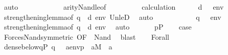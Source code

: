 \begin{isabellebody}
\ auto\isanewline
\ \ \ \ \isamarkupfalse%
\ \isanewline
\ \ \ \ \isamarkupfalse%
\ arity{\isacharunderscore}{\kern0pt}Nand{\isacharunderscore}{\kern0pt}le{\isacharbrackleft}{\kern0pt}of\ {\isasymphi}\ {\isasympsi}{\isacharbrackright}{\kern0pt}\isanewline
\ \ \ \ \isamarkupfalse%
\ \isamarkupfalse%
\ calculation\isanewline
\ \ \ \ \isamarkupfalse%
\ {\isachardoublequoteopen}d\ {\isasymtturnstile}\ {\isasymphi}\ env{\isachardoublequoteclose}\ \isanewline
\ \ \ \ \ \ \ \isamarkupfalse%
\ strengthening{\isacharunderscore}{\kern0pt}lemma{\isacharbrackleft}{\kern0pt}of\ q\ {\isasymphi}\ d\ env{\isacharbrackright}{\kern0pt}\ Un{\isacharunderscore}{\kern0pt}leD{}\ \isamarkupfalse%
\ auto\isanewline
\ \ \ \ \isamarkupfalse%
\isanewline
\ \ \ \ \isamarkupfalse%
\ {\isachardoublequoteopen}{\isasymnot}\ {\isacharparenleft}{\kern0pt}q\ {\isasymtturnstile}\ {\isasympsi}\ env{\isacharparenright}{\kern0pt}{\isachardoublequoteclose}\isanewline
\ \ \ \ \ \ \isamarkupfalse%
\ strengthening{\isacharunderscore}{\kern0pt}lemma{\isacharbrackleft}{\kern0pt}of\ q\ {\isasympsi}\ d\ env{\isacharbrackright}{\kern0pt}\ \isamarkupfalse%
\ auto\isanewline
\ \ \isacommand{{\isacharbraceright}{\kern0pt}}\isamarkupfalse%
\isanewline
\ \ \isamarkupfalse%
\ {\isacartoucheopen}p{\isasymin}P{\isacartoucheclose}\isanewline
\ \ \isamarkupfalse%
\ {\isacharquery}{\kern0pt}case\isanewline
\ \ \ \ \isamarkupfalse%
\ Forces{\isacharunderscore}{\kern0pt}Nand{\isacharbrackleft}{\kern0pt}symmetric{\isacharcomma}{\kern0pt}\ OF\ {\isacharunderscore}{\kern0pt}\ Nand{\isacharparenleft}{\kern0pt}{}{\isacharcomma}{\kern0pt}{}{\isacharcomma}{\kern0pt}{}{\isacharparenright}{\kern0pt}{\isacharbrackright}{\kern0pt}\ \isamarkupfalse%
\ blast\isanewline
{}\isamarkupfalse%
\isanewline
\ \ \isamarkupfalse%
\ {\isacharparenleft}{\kern0pt}Forall\ {\isasymphi}{\isacharparenright}{\kern0pt}\isanewline
\ \ \isamarkupfalse%
\ {\isachardoublequoteopen}dense{\isacharunderscore}{\kern0pt}below{\isacharparenleft}{\kern0pt}{\isacharbraceleft}{\kern0pt}q{\isasymin}P{\isachardot}{\kern0pt}\ q\ {\isasymtturnstile}\ {\isasymphi}\ {\isacharparenleft}{\kern0pt}{\isacharbrackleft}{\kern0pt}a{\isacharbrackright}{\kern0pt}{\isacharat}{\kern0pt}env{\isacharparenright}{\kern0pt}{\isacharbraceright}{\kern0pt}{\isacharcomma}{\kern0pt}p{\isacharparenright}{\kern0pt}{\isachardoublequoteclose}\ \ {\isachardoublequoteopen}a{\isasymin}M{\isachardoublequoteclose}\ \ a\isanewline

\end{isabellebody}
